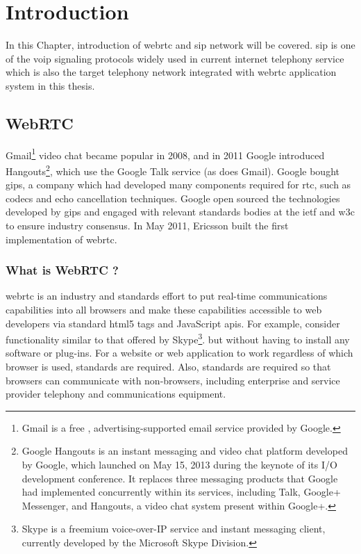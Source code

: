 \chapter{Introduction}
\label{chp:intro}
\noindent In this Chapter, introduction of \gls{webrtc} and \gls{sip} network will be covered. \gls{sip} is one of the \gls{voip} signaling protocols widely used in current internet telephony service which is also the target telephony network integrated with \gls{webrtc} application system in this thesis.

\section{WebRTC}

\noindent Gmail\footnote{Gmail is a free , advertising-supported email service provided by Google.} video chat became popular in 2008, and in 2011 Google introduced Hangouts\footnote{Google Hangouts is an instant messaging and video chat platform developed by Google, which launched on May 15, 2013 during the keynote of its I/O development conference. It replaces three messaging products that Google had implemented concurrently within its services, including Talk, Google+ Messenger, and Hangouts, a video chat system present within Google+.}, which use the Google Talk service (as does Gmail). Google bought \gls{gips}, a company which had developed many components required for \gls{rtc}, such as codecs and echo cancellation techniques. Google open sourced the technologies developed by \gls{gips} and engaged with relevant standards bodies at the \gls{ietf} and \gls{w3c} to ensure industry consensus. In May 2011, Ericsson built the first implementation of \gls{webrtc}.

\subsection{What is WebRTC ?}

\noindent \gls{webrtc} is an industry and standards effort to put real-time communications capabilities into all browsers and make these capabilities accessible to web developers via standard \gls{html5} tags and JavaScript \gls{api}s. For example, consider functionality similar to that offered by Skype\footnote{Skype is a freemium voice-over-IP service and instant messaging client, currently developed by the Microsoft Skype Division.\cite{wiki:skype}}. but without having to install any software or plug-ins. For a website or web application to work regardless of which browser is used, standards are required. Also, standards are required so that browsers can communicate with non-browsers, including enterprise and service provider telephony and communications equipment\cite{inbook:rtc-intro}.

